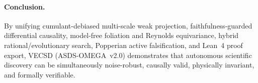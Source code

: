 \documentclass[11pt,a4paper]{article}
\begin{document}
\paragraph{Conclusion.}
By unifying cumulant-debiased multi-scale weak projection, faithfulness-guarded differential causality, model-free foliation and Reynolds equivariance, hybrid rational/evolutionary search, Popperian active falsification, and Lean~4 proof export, VECSD (ASDS-OMEGA~v2.0) demonstrates that autonomous scientific discovery can be simultaneously noise-robust, causally valid, physically invariant, and formally verifiable.



\end{document}
